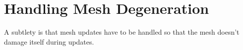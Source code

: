 \documentclass[book.tex]{subfiles}
\begin{document}
\section{Handling Mesh Degeneration}
A subtlety is that mesh updates have to be handled so that the mesh doesn't damage itself during updates. 
\end{document}

